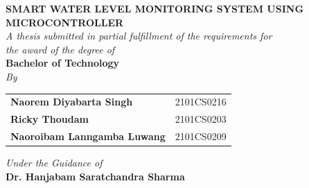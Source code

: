 {\centering
    \fontsize{22}{26}\selectfont \textbf{SMART WATER LEVEL MONITORING SYSTEM USING MICROCONTROLLER}\\
    \vspace{1cm}
    \fontsize{15}{18}\selectfont \textit{A thesis submitted in partial fulfillment of the requirements for}\\
    \fontsize{15}{18}\selectfont \textit{the award of the degree of}\\
    \vspace{0.5cm}
    \vspace{0.2cm}
    \fontsize{18}{21}\selectfont \textbf{Bachelor of Technology}\\
    \vspace{0.3cm}
    \fontsize{18}{21}\selectfont \textit{By}\\
    \vspace{0.3cm}
       \begin{center}
        \begin{tabular}{l l}
            \fontsize{14}{16}\selectfont \textbf{Naorem Diyabarta Singh} & 2101CS0216\\
            \fontsize{14}{16}\selectfont \textbf{Ricky Thoudam} & 2101CS0203\\
            \fontsize{14}{16}\selectfont \textbf{Naoroibam Lanngamba Luwang} & 2101CS0209\\
        \end{tabular}
    \end{center}
    \vspace{0.3cm}
    \begin{center}
        \fontsize{18}{21}\selectfont \textit{Under the Guidance of}\\
        \vspace{0.3cm}
        \fontsize{14}{16}\selectfont \textbf{Dr. Hanjabam Saratchandra Sharma}\\
    \end{center}
    \vspace{0.3cm}
    {\par}
}
